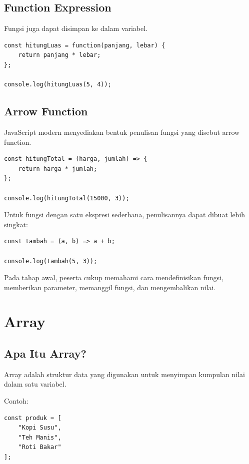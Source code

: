 \documentclass[12pt,a4paper]{article}
\begin{document}
\subsection{Function Expression}

Fungsi juga dapat disimpan ke dalam variabel.

\begin{lstlisting}
const hitungLuas = function(panjang, lebar) {
    return panjang * lebar;
};

console.log(hitungLuas(5, 4));
\end{lstlisting}

\subsection{Arrow Function}

JavaScript modern menyediakan bentuk penulisan
fungsi yang disebut arrow function.

\begin{lstlisting}
const hitungTotal = (harga, jumlah) => {
    return harga * jumlah;
};

console.log(hitungTotal(15000, 3));
\end{lstlisting}

Untuk fungsi dengan satu ekspresi sederhana,
penulisannya dapat dibuat lebih singkat:

\begin{lstlisting}
const tambah = (a, b) => a + b;

console.log(tambah(5, 3));
\end{lstlisting}

Pada tahap awal, peserta cukup memahami cara
mendefinisikan fungsi, memberikan parameter,
memanggil fungsi, dan mengembalikan nilai.

\section{Array}

\subsection{Apa Itu Array?}

Array adalah struktur data yang digunakan untuk
menyimpan kumpulan nilai dalam satu variabel.

Contoh:

\begin{lstlisting}
const produk = [
    "Kopi Susu",
    "Teh Manis",
    "Roti Bakar"
];
\end{lstlisting}
\end{document}
